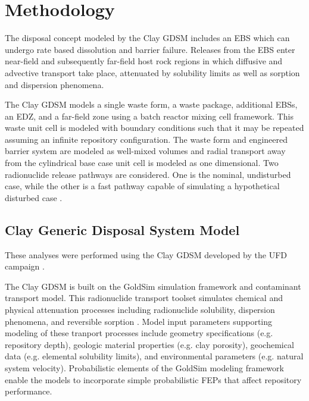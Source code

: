 \section{Methodology}

The disposal concept modeled by the Clay \gls{GDSM} includes an \gls{EBS} which 
can undergo rate based dissolution and barrier failure. Releases from the 
\gls{EBS} enter 
near-field and subsequently far-field host rock regions in which diffusive and 
advective transport take place, attenuated by solubility limits as well as 
sorption and dispersion phenomena.  

The Clay \gls{GDSM} models a single waste form, a waste package, additional 
\glspl{EBS}, 
an \gls{EDZ}, and a far-field zone using a batch reactor mixing cell framework. 
This waste unit cell is modeled 
with boundary conditions such that it may be repeated assuming an infinite 
repository configuration. The waste form and engineered barrier system are 
modeled as well-mixed volumes 
and radial transport away from the cylindrical base case unit cell is modeled as  
one dimensional. Two radionuclide release pathways are considered. One is the 
nominal, 
undisturbed case, while the other is a fast pathway capable of simulating a 
hypothetical disturbed case 
\cite{clayton_generic_2011}.

\subsection{Clay Generic Disposal System Model}

These analyses were performed using the Clay \gls{GDSM} developed by the 
\gls{UFD} campaign \cite{clayton_generic_2011}. 

The Clay \gls{GDSM} is built on the GoldSim simulation framework and contaminant 
transport model.  This radionuclide transport toolset simulates chemical and 
physical attenuation processes including radionuclide solubility, dispersion 
phenomena, and reversible sorption \cite{golder_goldsim_2010, 
golder_goldsim_ct_2010}. Model input parameters supporting modeling of these tranport 
processes include geometry specifications (e.g. repository depth), geologic 
material properties (e.g. clay porosity), geochemical data 
(e.g. elemental solubility limits), and environmental parameters (e.g. natural 
system velocity). Probabilistic elements of the GoldSim modeling 
framework enable the models to incorporate simple probabilistic \gls{FEPs} that 
affect repository performance.

